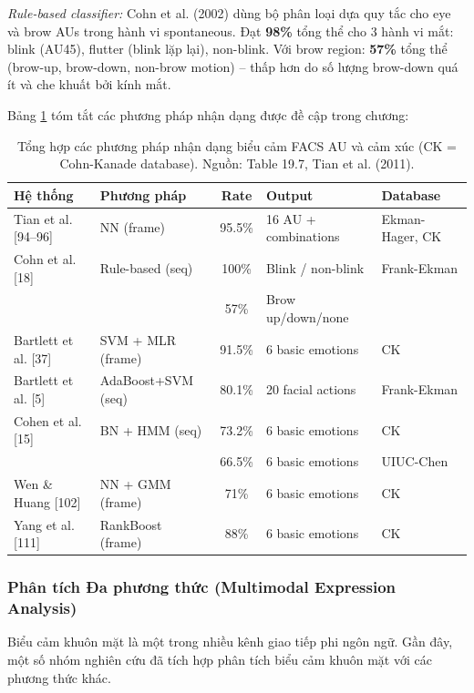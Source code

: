 \documentclass[12pt,a4paper]{article}
\let\oldtextbf\textbf
\renewcommand{\textbf}[1]{\oldtextbf{\textcolor{hcmublue}{#1}}}
\begin{document}
\textit{Rule-based classifier:} Cohn et al. (2002) dùng bộ phân loại dựa quy tắc cho eye và brow AUs trong hành vi spontaneous. Đạt \textbf{98\%} tổng thể cho 3 hành vi mắt: blink (AU45), flutter (blink lặp lại), non-blink. Với brow region: \textbf{57\%} tổng thể (brow-up, brow-down, non-brow motion) -- thấp hơn do số lượng brow-down quá ít và che khuất bởi kính mắt.

Bảng \ref{tab:recognition_methods} tóm tắt các phương pháp nhận dạng được đề cập trong chương:

\begin{table}[H]
\centering
\small
\begin{tabular}{|l|l|c|l|l|}
\hline
\textbf{Hệ thống} & \textbf{Phương pháp} & \textbf{Rate} & \textbf{Output} & \textbf{Database} \\ \hline
Tian et al. [94--96] & NN (frame) & 95.5\% & 16 AU + combinations & Ekman-Hager, CK \\ \hline
Cohn et al. [18] & Rule-based (seq) & 100\% & Blink / non-blink & Frank-Ekman \\ \hline
 & & 57\% & Brow up/down/none & \\ \hline
Bartlett et al. [37] & SVM + MLR (frame) & 91.5\% & 6 basic emotions & CK \\ \hline
Bartlett et al. [5] & AdaBoost+SVM (seq) & 80.1\% & 20 facial actions & Frank-Ekman \\ \hline
Cohen et al. [15] & BN + HMM (seq) & 73.2\% & 6 basic emotions & CK \\ \hline
 & & 66.5\% & 6 basic emotions & UIUC-Chen \\ \hline
Wen \& Huang [102] & NN + GMM (frame) & 71\% & 6 basic emotions & CK \\ \hline
Yang et al. [111] & RankBoost (frame) & 88\% & 6 basic emotions & CK \\ \hline
\end{tabular}
\caption{Tổng hợp các phương pháp nhận dạng biểu cảm FACS AU và cảm xúc (CK = Cohn-Kanade database). Nguồn: Table 19.7, Tian et al. (2011).}
\label{tab:recognition_methods}
\end{table}

\subsubsection{Phân tích Đa phương thức (Multimodal Expression Analysis)}

Biểu cảm khuôn mặt là một trong nhiều kênh giao tiếp phi ngôn ngữ. Gần đây, một số nhóm nghiên cứu đã tích hợp phân tích biểu cảm khuôn mặt với các phương thức khác.
\end{document}
